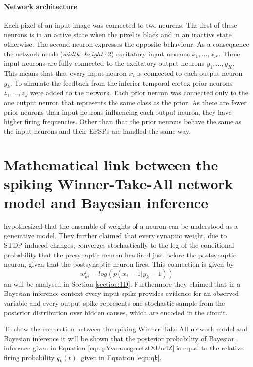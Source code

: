 \paragraph{Network architecture}
Each pixel of an input image was connected to two neurons. The first of these neurons is in an active state when the pixel is black and in an inactive state otherwise. The second neuron expresses the opposite behaviour. As a consequence the network needs ($width \cdot height \cdot 2$) excitatory input neurons $x_1,...,x_N$. These input neurons are fully connected to the excitatory output neurons $y_1,...,y_K$. This means that that every input neuron $x_i$ is connected to each output neuron $y_k$. 
To simulate the feedback from the inferior temporal cortex prior neurons $z_1,...,z_J$ were added to the network. Each prior neuron was connected only to the one  output neuron that represents the same class as the prior. As there are fewer prior neurons than input neurons influencing each output neuron, they have higher firing frequencies. Other than that the prior neurons behave the same as the input neurons and their EPSPs are handled the same way.


\section{Mathematical link between the spiking Winner-Take-All network model and Bayesian inference}
\label{linkNetworkBayes}

\citet{nessler} hypothesized that the ensemble of weights of a neuron can be understood as a generative model. They further claimed that every synaptic weight, due to STDP-induced changes,  converges stochastically to the log of the conditional probability that the presynaptic neuron has fired just before the postsynaptic neuron, given that the postsynaptic neuron fires. This connection is given by
\begin{equation}
 w^{i}_{ki} = log(p(x_i = 1 | y_k = 1))
\end{equation}
an will be analysed in Section \ref{section:1D}.
Furthermore they claimed that in a Bayesian inference context every input spike provides evidence for an observed variable and every output spike represents one stochastic sample from the posterior distribution over hidden causes, which are encoded in the circuit. 

To show the connection between the spiking Winner-Take-All network model and Bayesian inference it will be shown that the posterior probability of Bayesian inference given in Equation \ref{eqn:pYvorausgesetztXUndZ} is equal to the relative firing probability $q_k(t)$, given in Equation \ref{eqn:qk}.

